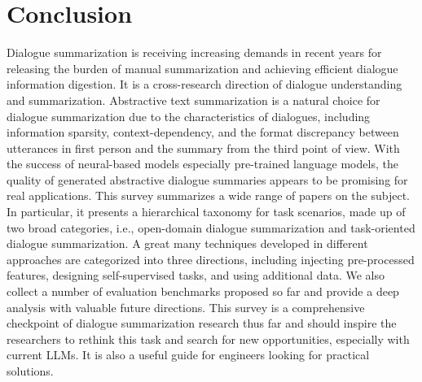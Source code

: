 \section{Conclusion}


Dialogue summarization is receiving increasing demands in recent years for releasing the burden of manual summarization and achieving efficient dialogue information digestion.
It is a cross-research direction of dialogue understanding and summarization.
Abstractive text summarization is a natural choice for dialogue 
summarization due to the characteristics of dialogues, including information 
sparsity, context-dependency, and the format discrepancy between 
utterances in first person and the summary from the third point of view. 
With the success of neural-based models especially pre-trained language models, 
the quality of generated abstractive dialogue summaries appears to be promising
for real applications.
This survey summarizes a wide range of papers on the subject.
In particular, it presents a hierarchical taxonomy for task scenarios, made up of two broad categories, i.e., open-domain dialogue summarization and task-oriented dialogue summarization.
A great many techniques developed in different approaches are categorized into three directions, including injecting pre-processed features, designing self-supervised tasks, and using additional data.
We also collect a number of evaluation benchmarks proposed so far and provide a deep analysis with valuable future directions.
This survey is a comprehensive checkpoint of dialogue summarization research thus far
and should inspire the researchers to rethink this task and 
search for new opportunities, especially with current LLMs. It is also a useful guide for engineers 
looking for practical solutions.
